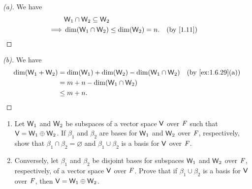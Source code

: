 \begin{proof}[(a)]
  We have
  \begin{align*}
             & \W_1 \cap \W_2 \subseteq \W_2                                          \\
    \implies & \dim(\W_1 \cap \W_2) \leq \dim(\W_2) = n. &  & \text{(by \cref{1.11})}
  \end{align*}
\end{proof}

\begin{proof}[(b)]
  We have
  \begin{align*}
    \dim(\W_1 + \W_2) & = \dim(\W_1) + \dim(\W_2) - \dim(\W_1 \cap \W_2) &  & \text{(by \cref{ex:1.6.29}(a))} \\
                      & = m + n - \dim(\W_1 \cap \W_2)                                                        \\
                      & \leq m + n.
  \end{align*}
\end{proof}

\setcounter{ex}{32}
\begin{ex}\label{ex:1.6.33}
  \quad
  \begin{enumerate}
    \item Let \(\mathsf{W}_1\) and \(\mathsf{W}_2\) be subspaces of a vector space \(\mathsf{V}\) over \(\mathit{F}\) such that \(\mathsf{V} = \mathsf{W}_1 \oplus \mathsf{W}_2\).
          If \(\beta_1\) and \(\beta_2\) are bases for \(\mathsf{W}_1\) and \(\mathsf{W}_2\) over \(\mathit{F}\), respectively, show that \(\beta_1 \cap \beta_2 = \varnothing\) and \(\beta_1 \cup \beta_2\) is a basis for \(\mathsf{V}\) over \(\mathit{F}\).
    \item Conversely, let \(\beta_1\) and \(\beta_2\) be disjoint bases for subspaces \(\mathsf{W}_1\) and \(\mathsf{W}_2\) over \(\mathit{F}\), respectively, of a vector space \(\mathsf{V}\) over \(\mathit{F}\).
          Prove that if \(\beta_1 \cup \beta_2\) is a basis for \(\mathsf{V}\) over \(\mathit{F}\), then \(\mathsf{V} = \mathsf{W}_1 \oplus \mathsf{W}_2\).
  \end{enumerate}
\end{ex}

